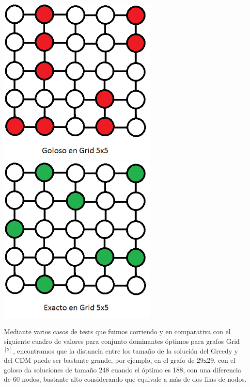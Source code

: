 \includegraphics[width=8cm]{./graficos/grid_5x5_goloso.png}
\includegraphics[width=8cm]{./graficos/grid_5x5_exacto.png}

Mediante varios casos de tests que fuimos corriendo y en comparativa con el  siguiente cuadro de valores para conjunto dominantes óptimos para grafos Grid$^{[2]}$, encontramos que la distancia entre los tamaño de la solución
del Greedy y del CDM puede ser bastante grande, por ejemplo, en el grafo de 29x29, con el goloso da soluciones de tamaño 248 cuando el óptimo es 188, con una diferencia de 60 nodos, bastante alto considerando que equivale a más de dos filas de nodos.\\

